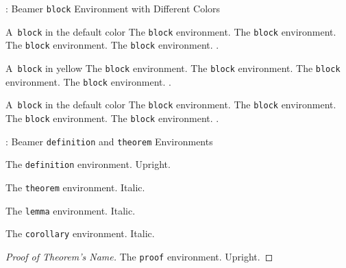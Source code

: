 \begin{frame}{\titleprefix: Beamer \texttt{block} Environment with Different Colors}

\begin{block}{A~\texttt{block} in the default color}
	The \texttt{block} environment. The \texttt{block} environment. The \texttt{block} environment. The \texttt{block} environment. \insertblocktitle.\strut  %
\end{block}%

{%
	\renewcommand{\framedblockcolor}{UBonnYellow}%
	\begin{block}{A~\texttt{block} in yellow}
		The \texttt{block} environment. The \texttt{block} environment. The \texttt{block} environment. The \texttt{block} environment. \insertblocktitle.\strut  %
	\end{block}%
}

\begin{block}{A~\texttt{block} in the default color}
	The \texttt{block} environment. The \texttt{block} environment. The \texttt{block} environment. The \texttt{block} environment. \insertblocktitle.\strut  %
\end{block}%

\end{frame}


\begin{frame}{\titleprefix: Beamer \texttt{definition} and \texttt{theorem} Environments}

\begin{definition}
	The \texttt{definition} environment. Upright.
\end{definition}

\begin{theorem}
	The \texttt{theorem} environment. Italic.
\end{theorem}%

\begin{lemma}
	The \texttt{lemma} environment. Italic.
\end{lemma}%

\begin{corollary}
	The \texttt{corollary} environment. Italic.
\end{corollary}%

\begin{proof}[Proof of Theorem's Name]
	The \texttt{proof} environment. Upright.
\end{proof}

\end{frame}


